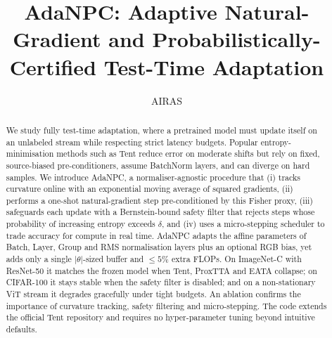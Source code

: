 \documentclass{article} %
\title{AdaNPC\@: Adaptive Natural-Gradient and Probabilistically-Certified Test-Time Adaptation}
\author{AIRAS}
\begin{document}
\maketitle

\begin{abstract}
We study fully test-time adaptation, where a pretrained model must update itself on an unlabeled stream while respecting strict latency budgets. Popular entropy-minimisation methods such as Tent reduce error on moderate shifts but rely on fixed, source-biased pre-conditioners, assume BatchNorm layers, and can diverge on hard samples. We introduce AdaNPC, a normaliser-agnostic procedure that (i) tracks curvature online with an exponential moving average of squared gradients, (ii) performs a one-shot natural-gradient step pre-conditioned by this Fisher proxy, (iii) safeguards each update with a Bernstein-bound safety filter that rejects steps whose probability of increasing entropy exceeds \(\delta\), and (iv) uses a micro-stepping scheduler to trade accuracy for compute in real time. AdaNPC adapts the affine parameters of Batch, Layer, Group and RMS normalisation layers plus an optional RGB bias, yet adds only a single \(\lvert\theta\rvert\)-sized buffer and \(\leq 5 \%\) extra FLOPs. On ImageNet-C with ResNet-50 it matches the frozen model when Tent, ProxTTA and EATA collapse; on CIFAR-100 it stays stable when the safety filter is disabled; and on a non-stationary ViT stream it degrades gracefully under tight budgets. An ablation confirms the importance of curvature tracking, safety filtering and micro-stepping. The code extends the official Tent repository and requires no hyper-parameter tuning beyond intuitive defaults.
\end{abstract}
\end{document}
